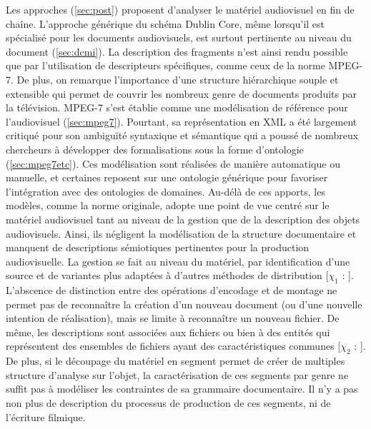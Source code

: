 Les approches  (\ref{sec:post}) proposent d'analyser le matériel audiovisuel en fin de chaîne. 
L'approche générique du schéma Dublin Core, même lorsqu'il est spécialisé pour les documents audiovisuels, est surtout pertinente au niveau du document (\ref{sec:dcmi}). 
La description des fragments n'est ainsi rendu possible que par l'utilisation de descripteurs spécifiques, comme ceux de la norme MPEG-7. 
De plus, on remarque l'importance d'une structure hiérarchique souple et extensible qui permet de couvrir les nombreux genre de documents produits par la télévision.
MPEG-7 s'est établie comme une modélisation de référence pour l'audiovisuel (\ref{sec:mpeg7}).
Pourtant, sa représentation en XML a été largement critiqué pour son ambiguïté syntaxique et sémantique qui a poussé de nombreux chercheurs à développer des formalisations sous la forme d'ontologie (\ref{sec:mpeg7etc}).
Ces modélisation sont réalisées de manière automatique ou manuelle, et certaines reposent sur une ontologie générique pour favoriser l'intégration avec des ontologies de domaines.
Au-délà de ces apports, les modèles, comme la norme originale, adopte une point de vue centré sur le matériel audiovisuel tant au niveau de la gestion que de la description des objets audiovisuels. 
Ainsi, ils négligent la modélisation de la structure documentaire et manquent de descriptions sémiotiques pertinentes pour la production audiovisuelle. %
La gestion se fait au niveau du matériel, par identification d'une source et de variantes plus adaptées à d'autres méthodes de distribution [$\chi_1$ : ].
L'abscence de distinction entre des opérations d'encodage et de montage ne permet pas de reconnaître la création d'un nouveau document (ou d'une nouvelle intention de réalisation), mais se limite à reconnaître un nouveau fichier.
De même, les descriptions sont associées aux fichiers ou bien à des entités qui représentent des ensembles de fichiers ayant des caractéristiques communes [$\chi_2$ : ]. 
De plus, si le découpage du matériel en segment permet de créer de multiples structure d'analyse sur l'objet, la caractérisation de ces segments par genre ne suffit pas à modéliser les contraintes de sa grammaire documentaire.
Il n'y a pas non plus de description du processus de production de ces segments, ni de l'écriture filmique.

